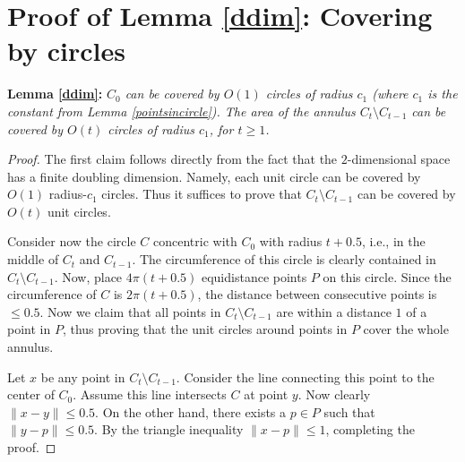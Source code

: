 \documentclass[11pt]{amsart}
\begin{document}
\section{Proof of Lemma \ref{ddim}: Covering by circles}
\label{app:b}
\noindent \textbf{Lemma \ref{ddim}:} \emph{
$C_0$ can be covered by $O(1)$ circles of radius $c_1$
 (where $c_1$ is the constant from Lemma \ref{pointsincircle}). 
The area of the annulus $C_t \setminus C_{t-1}$ can be covered by $O(t)$ circles of radius $c_1$, for $t \geq 1$.
}

\begin{proof}
The first claim follows directly from the fact that the $2$-dimensional space has a finite doubling dimension.
Namely, each unit circle can be covered by $O(1)$ radius-$c_1$ circles.
Thus it suffices to prove that $C_t \setminus C_{t-1}$ can be covered
by $O(t)$ unit circles.

Consider now the circle $C$ concentric with $C_0$ with
radius $t + 0.5$, i.e., in the middle of $C_t$ and $C_{t-1}$. 
The circumference of this circle is clearly contained in
$C_t \setminus C_{t-1}$. Now, place $4 \pi (t + 0.5)$ equidistance
points $P$ on this circle. Since the circumference of $C$ is 
$2 \pi (t + 0.5)$, the distance between consecutive points is $\leq 0.5$. 
Now we
claim that all points in $C_t \setminus C_{t-1}$ are within a distance
$1$ of a point in $P$, thus proving that the unit circles
around points in $P$ cover the whole annulus.

Let $x$ be any point in $C_t \setminus C_{t-1}$. Consider the line
connecting this point to the center of $C_0$.  Assume this line
intersects $C$ at point $y$. Now clearly $\|x - y\| \leq 0.5$. On the
other hand, there exists a $p \in P$ such that $\|y - p\| \leq
0.5$. By the triangle inequality $\|x - p\| \leq 1$, completing the
proof.
\end{proof}
\end{document}

